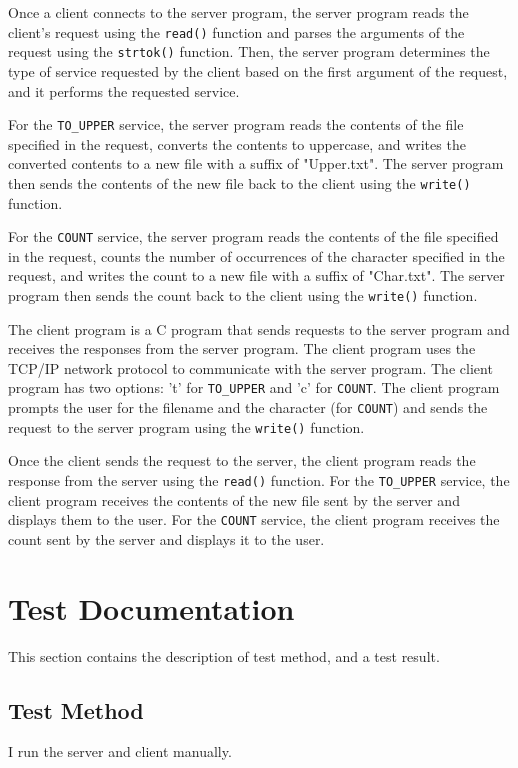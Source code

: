 \documentclass{article}
\begin{document}
Once a client connects to the server program, the server program reads the client's request using the \texttt{read()} function and parses the arguments of the request using the \texttt{strtok()} function. Then, the server program determines the type of service requested by the client based on the first argument of the request, and it performs the requested service.

For the \texttt{TO\_UPPER} service, the server program reads the contents of the file specified in the request, converts the contents to uppercase, and writes the converted contents to a new file with a suffix of "Upper.txt". The server program then sends the contents of the new file back to the client using the \texttt{write()} function.

For the \texttt{COUNT} service, the server program reads the contents of the file specified in the request, counts the number of occurrences of the character specified in the request, and writes the count to a new file with a suffix of "Char.txt". The server program then sends the count back to the client using the \texttt{write()} function.

The client program is a C program that sends requests to the server program and receives the responses from the server program. The client program uses the TCP/IP network protocol to communicate with the server program. The client program has two options: 't' for \texttt{TO\_UPPER} and 'c' for \texttt{COUNT}. The client program prompts the user for the filename and the character (for \texttt{COUNT}) and sends the request to the server program using the \texttt{write()} function.

Once the client sends the request to the server, the client program reads the response from the server using the \texttt{read()} function. For the \texttt{TO\_UPPER} service, the client program receives the contents of the new file sent by the server and displays them to the user. For the \texttt{COUNT} service, the client program receives the count sent by the server and displays it to the user.

\section{Test Documentation}
This section contains the description of test method, and a test result.
\subsection{Test Method}
I run the server and client manually.
\end{document}

